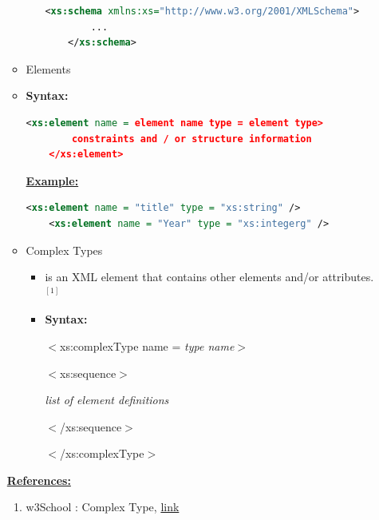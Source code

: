 \documentclass[12pt]{article}
\begin{document}
\begin{enumerate}[1.]
\begin{itemize}
\begin{itemize}
\begin{lstlisting}[language=XML]
    <xs:schema xmlns:xs="http://www.w3.org/2001/XMLSchema">
        ...
    </xs:schema>
    \end{lstlisting}

        \end{itemize}
        \item Elements
        \item \textbf{Syntax:}

        \bigskip

    \begin{lstlisting}[language=XML]
    <xs:element name = element name type = element type>
        constraints and / or structure information
    </xs:element>
    \end{lstlisting}

        \bigskip

        \underline{\textbf{Example:}}

        \bigskip

    \begin{lstlisting}[language=XML]
    <xs:element name = "title" type = "xs:string" />
    <xs:element name = "Year" type = "xs:integerg" />

    \end{lstlisting}

        \item Complex Types
        \begin{itemize}
            \item is an XML element that contains other elements and/or attributes. $^{[1]}$
            \item \textbf{Syntax:}

            \bigskip

            $<$xs:complexType name = \textit{type name}$>$

            \quad$<$xs:sequence$>$

            \quad\quad\textit{list of element definitions}

            \quad$<$/xs:sequence$>$

            $<$/xs:complexType$>$
        \end{itemize}
    \end{itemize}

    \bigskip

    \underline{\textbf{References:}}

    \bigskip

    \begin{enumerate}[1.]
        \item w3School : Complex Type, \href{https://www.w3schools.com/xml/el_complextype.asp}{link}
    \end{enumerate}





\end{enumerate}
\end{document}
